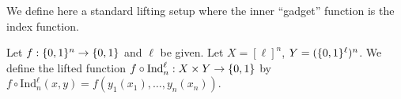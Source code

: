 We define here a standard lifting setup where the inner ``gadget'' function is the index function.%
\begin{definition}
Let $f: \{0,1\}^n \to \{0,1\}$ and $\ell$ be given. Let $X = [\ell]^n$, $Y = (\{0,1\}^\ell)^n$. We define the lifted function $f \circ \mathrm{Ind}_n^\ell: X \times Y \to \{0,1\}$ by $f \circ \mathrm{Ind}_n^\ell(x,y) = f(y_1(x_1),\ldots,y_n(x_n))$. 
\end{definition}

